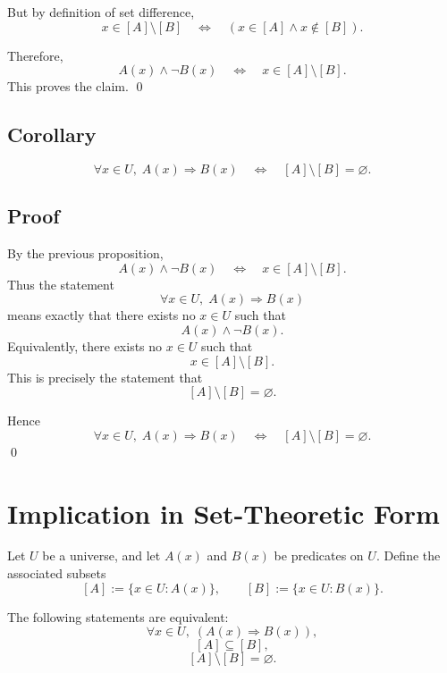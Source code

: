 \documentclass{article}
\begin{document}
	But by definition of set difference,
	\[
	x\in[A]\setminus[B]
	\quad\Longleftrightarrow\quad
	(x\in[A]\land x\notin[B]).
	\]
	
	Therefore,
	\[
	A(x)\land \neg B(x)
	\quad\Longleftrightarrow\quad
	x\in[A]\setminus[B].
	\]
	This proves the claim.
	\qed
	
	\subsection*{Corollary}
	\[
	\forall x\in U,\; A(x)\Rightarrow B(x)
	\quad\Longleftrightarrow\quad
	[A]\setminus[B]=\varnothing.
	\]
	
	\subsection*{Proof}
	By the previous proposition,
	\[
	A(x)\land \neg B(x)
	\quad\Longleftrightarrow\quad
	x\in[A]\setminus[B].
	\]
	Thus the statement
	\[
	\forall x\in U,\; A(x)\Rightarrow B(x)
	\]
	means exactly that there exists no \(x\in U\) such that
	\[
	A(x)\land \neg B(x).
	\]
	Equivalently, there exists no \(x\in U\) such that
	\[
	x\in[A]\setminus[B].
	\]
	This is precisely the statement that
	\[
	[A]\setminus[B]=\varnothing.
	\]
	
	Hence
	\[
	\forall x\in U,\; A(x)\Rightarrow B(x)
	\quad\Longleftrightarrow\quad
	[A]\setminus[B]=\varnothing.
	\]
	\qed
	
	\section*{Implication in Set-Theoretic Form}
	
	Let \(U\) be a universe, and let \(A(x)\) and \(B(x)\) be predicates on \(U\).  
	Define the associated subsets
	\[
	[A]:=\{x\in U : A(x)\},
	\qquad
	[B]:=\{x\in U : B(x)\}.
	\]
	
	\begin{theorem}
		The following statements are equivalent:
		\[
		\forall x\in U,\; (A(x)\Rightarrow B(x)),
		\]
		\[
		[A]\subseteq[B],
		\]
		\[
		[A]\setminus[B]=\varnothing.
		\]
	\end{theorem}
	
\end{document}
